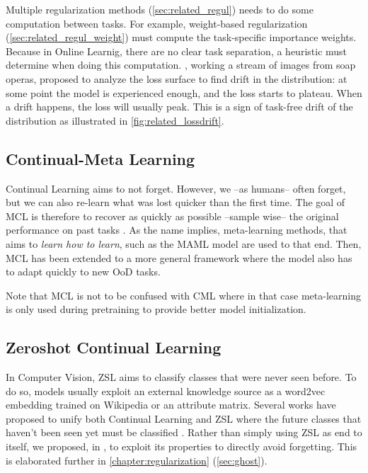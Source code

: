 Multiple regularization methods (\autoref{sec:related_regul}) needs to do some computation between
tasks. For example, weight-based regularization (\autoref{sec:related_regul_weight}) must compute
the task-specific importance weights. Because in Online Learnig, there are no clear task separation,
a heuristic must determine when doing this computation. \cite{aljundi2019taskfree}, working a stream
of images from soap operas, proposed to analyze the loss surface to find drift in the distribution:
at some point the model is experienced enough, and the loss starts to plateau. When a drift happens,
the loss will usually peak. This is a sign of task-free drift of the distribution as
illustrated in \autoref{fig:related_lossdrift}.

\subsection{Continual-Meta Learning}
\label{sec:related_meta}


Continual Learning aims to not forget. However, we --as humans-- often forget, but we can also
re-learn what was lost quicker than the first time. The goal of \ac{MCL} is therefore to recover as
quickly as possible --sample wise-- the original performance on past tasks
\citep{he2019metacontinual}. As the name implies, meta-learning methods, that aims to \textit{learn
      how to learn}, such as the MAML model \citep{finn2017maml} are used to that end. Then, \ac{MCL} has
been extended to a more general framework where the model also has to adapt quickly to new \acf{OoD}
tasks.

Note that \acf{MCL} is not to be confused with \acf{CML} where in that case meta-learning is only
used during pretraining to provide better model initialization.

\subsection{Zeroshot Continual Learning}
\label{sec:related_zeroshot}


In Computer Vision, \acf{ZSL} \citep{lampert2009zeroshot,xian2019awa2} aims to classify classes that
were never seen before. To do so, models usually exploit an external knowledge source as a word2vec
embedding \citep{mikolov2013word2vec} trained on Wikipedia or an attribute matrix. Several works
have proposed to unify both Continual Learning and \ac{ZSL} where the future classes that haven't
been seen yet must be classified
\cite{lopezpaz2017gem,wei2020lifelongzeroshot,gautam2020continualzeroshot}. Rather than simply using
\ac{ZSL} as end to itself, we proposed, in \citep{douillard2020ghost}, to exploit its properties to
directly avoid forgetting. This is elaborated further in \autoref{chapter:regularization}
(\autoref{sec:ghost}).

